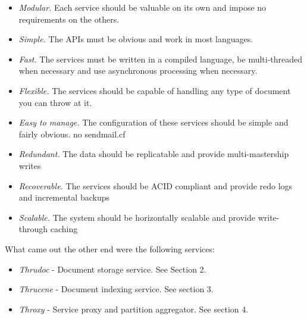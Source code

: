\documentclass[nocopyrightspace,blockstyle]{sigplanconf}
\begin{document}
\begin{itemize}

\item\textit{Modular.} Each service should be valuable on its own and impose no requirements on the others.

\item\textit{Simple.} The APIs must be obvious and work in most languages.

\item\textit{Fast.} The services must be written in a compiled language, be multi-threaded when necessary and use asynchronous processing when necessary.

\item\textit{Flexible.} The services should be capable of handling any type of document you can throw at it. 

\item\textit{Easy to manage.} The configuration of these services should be simple and fairly obvious. no sendmail.cf 

\item\textit{Redundant.} The data should be replicatable and provide multi-mastership writes

\item\textit{Recoverable.} The services should be ACID compliant and provide redo logs and incremental backups

\item\textit{Scalable.} The system should be horizontally scalable and provide write-through caching  
\end{itemize}

What came out the other end were the following services:

\begin{itemize}
\item\textit{Thrudoc}   - Document storage service. See Section 2. 

\item\textit{Thrucene}  - Document indexing service. See section 3.

\item\textit{Throxy}    - Service proxy and partition aggregator. See section 4.
\end{itemize}
\end{document}
